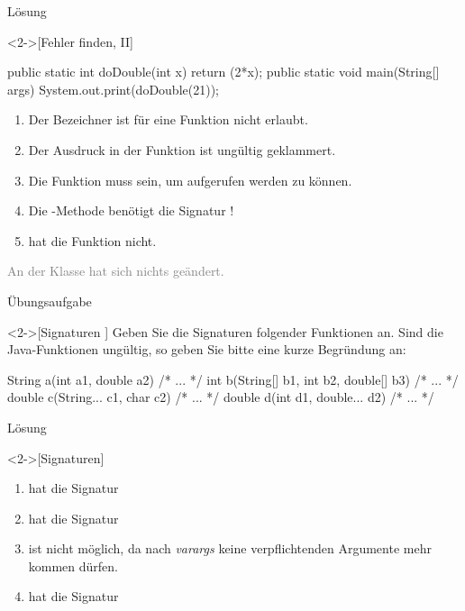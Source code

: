 \begin{frame}[c,fragile]{Lösung}
    \begin{solve}<2->[Fehler finden, II]
        \pause{}\begin{plainjava}
public static int doDouble(int x) { return (2*x); }
public static void main(String[] args) {
    System.out.print(doDouble(21));
}
        \end{plainjava}
    \begin{enumerate}[<+(1)->]
        \item Der Bezeichner  ist für eine Funktion nicht erlaubt.
        \item Der Ausdruck in der Funktion ist ungültig geklammert.
        \item Die Funktion muss  sein, um aufgerufen werden zu können.
        \item Die -Methode benötigt die Signatur !
        \item {} hat die Funktion  nicht.
    \end{enumerate}
    \pause{}\textcolor{gray}{An der Klasse hat sich nichts geändert.}
    \end{solve}
\end{frame}

\begin{frame}[c,fragile]{Übungsaufgabe}
    \begin{exercise}<2->[Signaturen ]
        \pause{}Geben Sie die Signaturen folgender Funktionen an.\pause{} Sind die Java-Funktionen ungültig, so geben Sie bitte eine kurze Begründung an:\pause{}
        \begin{plainvoid}
String a(int a1, double a2) { /* ... */ }
int b(String[] b1, int b2, double[] b3) { /* ... */ }
double c(String... c1, char c2) { /* ... */ }
double d(int d1, double... d2) { /* ... */ }
        \end{plainvoid}
    \end{exercise}
\end{frame}

\begin{frame}[c]{Lösung}
    \begin{solve}<2->[Signaturen]
        \begin{enumerate}[<+(1)->]
            \item {} hat die Signatur 
            \item {} hat die Signatur 
            \item {} ist nicht möglich,\pause{} da nach \emph{varargs} keine verpflichtenden Argumente mehr kommen dürfen.
            \item {} hat die Signatur 
        \end{enumerate}
    \end{solve}
\end{frame}

